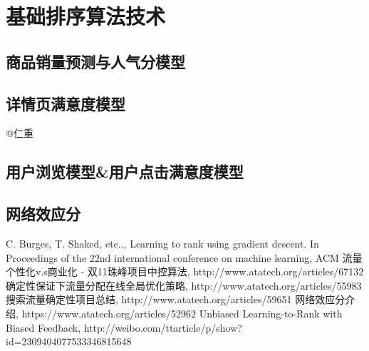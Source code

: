 
\chapter{ 基础排序算法技术 }
\thispagestyle{empty}

\setlength{\fboxrule}{0pt}\setlength{\fboxsep}{0cm}
\noindent\shadowbox{
\begin{tcolorbox}[arc=0mm,colback=lightblue,colframe=darkblue,title=学习目标与要求]

\end{tcolorbox}}
\setlength{\fboxrule}{1pt}\setlength{\fboxsep}{4pt} 

\section{商品销量预测与人气分模型 }

\section{详情页满意度模型} 
@仁重

\section{用户浏览模型\&用户点击满意度模型}  

\section{网络效应分}


\begin{thebibliography}{99}
 C. Burges, T. Shaked, etc.., Learning to rank 
using gradient descent. In Proceedings of the 22nd international 
conference on machine learning, ACM
 流量个性化v.s商业化 - 双11珠峰项目中控算法, http://www.atatech.org/articles/67132
 确定性保证下流量分配在线全局优化策略, http://www.atatech.org/articles/55983
 搜索流量确定性项目总结, http://www.atatech.org/articles/59651
 网络效应分介绍, https://www.atatech.org/articles/52962
 Unbiased Learning-to-Rank with Biased Feedback, http://weibo.com/ttarticle/p/show?id=2309404077533346815648
\end{thebibliography}

 
